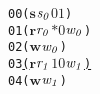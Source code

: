 \newcommand{\epsnd}{\textit{$N_s$}}
\newcommand{\eprcv}{\textit{$N_r$}}
\newcommand{\epwait}{\textit{$P_r$}}
\newcommand{\epbarrier}{\textit{$N_b$}}
\newcommand{\frm}{\textit{frm}}
\newcommand{\vbot}{\textit{v$-\bot$}}
\newcommand{\status}{\textit{s}}
\newcommand{\error}{\ensuremath{\mathbf{error}}}
\newcommand{\aidmap}{\textit{A}}
\newcommand{\thread}{\ensuremath{\mathit{p}}}
\newcommand{\aid}{\ensuremath{\mathit{x}}}
\newcommand{\num}{\ensuremath{\mathit{v}}}
\newcommand{\rcvp}{\ensuremath{\mathit{pt}}}
\newcommand{\npro}{\ensuremath{\mathit{n}}}
\newcommand{\cmd}{\ensuremath{\mathit{e}}}
\newcommand{\op}{\ensuremath{\mathit{op}}}
\newcommand{\comm}{\ensuremath{\mathit{cm}}}
\newcommand{\applyop}{\ensuremath{\mathrm{op}}}
\newcommand{\wait}{\ensuremath{\mathbf{w}}}
\newcommand{\sendi}{\ensuremath{\mathbf{s}}}
\newcommand{\recvi}{\ensuremath{\mathbf{r}}}
\newcommand{\barrier}{\ensuremath{\mathbf{b}}}
\newcommand{\traceentry}{\ensuremath{\sigma}}
\newcommand{\movelist}{\ensuremath{\delta}}
\newcommand{\ep}{\ensuremath{\mathbf{\gamma}}}
\newcommand{\src}{\ensuremath{\alpha}}
\newcommand{\dst}{\ensuremath{\beta}}
\newcommand{\true}{\ensuremath{\mathbf{true}}}
\newcommand{\false}{\ensuremath{\mathbf{false}}}
\newcommand{\match}{\ensuremath{\mathrm{m}}}
\newcommand{\matchl}{\ensuremath{\mathrm{match}}}
\newcommand{\findrecv}{\ensuremath{\mathrm{search_r}}}
\newcommand{\smt}{\ensuremath{\mathit{smt}}}

\newcommand{\statuschange}{\left\{ \begin{array}{ll}  \status &\ \mathrm{if}\ |\epsnd(\dst)(\src)|>0\\
   \mathit{error} &\  \mathrm{otherwise}\end{array}\right .}

\newcommand{\reduce}[1]{\ensuremath{\rightarrow_{#1}}}
\newcommand{\reduceK}[1]{\ensuremath{\rightarrow_{#1}^{*}}}
\newcommand{\reduceN}[1]{\ensuremath{\dashrightarrow_{#1}}}
\newcommand{\reduceNK}[1]{\ensuremath{\dashrightarrow_{#1}^{*}}}
\newcommand{\mt}{\ensuremath{mt}}
\newcommand{\trace}{\ensuremath{\mathit{trace}}}
\newcommand{\movebot}{\ensuremath{\mathit{m}}}
\newcommand{\ret}{\ensuremath{\mathbf{ret}}}


\newsavebox{\boxTZero}
\begin{lrbox}{\boxTZero}
\begin{minipage}[t]{0.65\linewidth}
\large
\begin{alltt}
00 (\(\mathbf{s}\) \(\mathit{s\sb{0}}\) \(\mathit{0 1}\))
01 (\(\mathbf{r}\) \(\mathit{r\sb{0}}\) \(\mathit{\ast 0}\) \(\mathit{w\sb{0}}\))
02 (\(\mathbf{w}\) \(\mathit{w\sb{0}}\)) 
03 \underline{(\(\mathbf{r}\) \(\mathit{r\sb{1}}\) \(\mathit{1 0}\) \(\mathit{w\sb{1}}\))}
04 (\(\mathbf{w}\) \(\mathit{w\sb{1}}\))
\end{alltt}
\end{minipage}
\end{lrbox}

